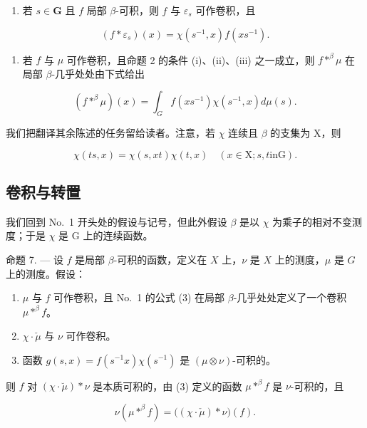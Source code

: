\begin{enumerate}
\def\labelenumi{\arabic{enumi})}
\tightlist
\item
  若 \(s \in \mathbf{G}\) 且 \(f\) 局部 \(\beta\)-可积，则 \(f\) 与 \(\varepsilon_s\) 可作卷积，且
\end{enumerate}

\[
(f * \varepsilon_ {s}) (x) = \chi (s ^ {- 1}, x) f (x s ^ {- 1}).\tag{4}
\]

\begin{enumerate}
\def\labelenumi{\arabic{enumi})}
\setcounter{enumi}{1}
\tightlist
\item
  若 \(f\) 与 \(\mu\) 可作卷积，且命题 2 的条件 (i)、(ii)、(iii) 之一成立，则 \(f *^{\beta} \mu\) 在局部 \(\beta\)-几乎处处由下式给出
\end{enumerate}

\[
(f * ^ {\beta} \mu) (x) = \int_ {G} f (x s ^ {- 1}) \chi (s ^ {- 1}, x) d \mu (s).\tag{5}
\]

我们把翻译其余陈述的任务留给读者。注意，若 \(\chi\) 连续且 \(\beta\) 的支集为 X，则

\[
\chi (t s, x) = \chi (s, x t) \chi (t, x) \quad (x \in \mathrm{X}; s, t \text {in} \mathrm{G}).\tag{6}
\]

\subsection{卷积与转置}

我们回到 No.~1 开头处的假设与记号，但此外假设 \(\beta\) 是以 \(\chi\) 为乘子的相对不变测度；于是 \(\chi\) 是 G 上的连续函数。

命题 7. --- 设 \(f\) 是局部 \(\beta\)-可积的函数，定义在 \(X\) 上，\(\nu\) 是 \(X\) 上的测度，\(\mu\) 是 \(G\) 上的测度。假设：

\begin{enumerate}
\def\labelenumi{(\roman{enumi})}
\item
  \(\mu\) 与 \(f\) 可作卷积，且 No.~1 的公式 (3) 在局部 \(\beta\)-几乎处处定义了一个卷积 \(\mu *^{\beta} f\)。
\item
  \(\chi \cdot \check{\mu}\) 与 \(\nu\) 可作卷积。
\item
  函数 \(g(s,x) = f(s^{-1}x)\chi (s^{-1})\) 是 \((\mu \otimes \nu)\)-可积的。
\end{enumerate}

则 \(f\) 对 \((\chi \cdot \breve{\mu}) * \nu\) 是本质可积的，由 (3) 定义的函数 \(\mu *^{\beta} f\) 是 \(\nu\)-可积的，且

\[
\nu (\mu * ^ {\beta} f) = \big ((\chi \cdot \check {\mu}) * \nu \big) (f).\tag{7}
\]

